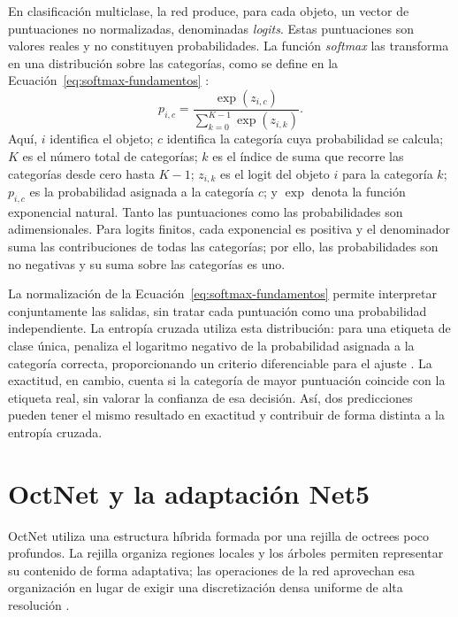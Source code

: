 En clasificación multiclase, la red produce, para cada objeto, un vector de puntuaciones no normalizadas, denominadas \emph{logits}. Estas puntuaciones son valores reales y no constituyen probabilidades. La función \emph{softmax} las transforma en una distribución sobre las categorías, como se define en la Ecuación~\eqref{eq:softmax-fundamentos} \parencite{goodfellow2016}:
\begin{equation}
 p_{i,c}=\frac{\exp(z_{i,c})}{\displaystyle\sum_{k=0}^{K-1}\exp(z_{i,k})}.
 \label{eq:softmax-fundamentos}
\end{equation}
Aquí, $i$ identifica el objeto; $c$ identifica la categoría cuya probabilidad se calcula; $K$ es el número total de categorías; $k$ es el índice de suma que recorre las categorías desde cero hasta $K-1$; $z_{i,k}$ es el logit del objeto $i$ para la categoría $k$; $p_{i,c}$ es la probabilidad asignada a la categoría $c$; y $\exp$ denota la función exponencial natural. Tanto las puntuaciones como las probabilidades son adimensionales. Para logits finitos, cada exponencial es positiva y el denominador suma las contribuciones de todas las categorías; por ello, las probabilidades son no negativas y su suma sobre las categorías es uno.

La normalización de la Ecuación~\eqref{eq:softmax-fundamentos} permite interpretar conjuntamente las salidas, sin tratar cada puntuación como una probabilidad independiente. La entropía cruzada utiliza esta distribución: para una etiqueta de clase única, penaliza el logaritmo negativo de la probabilidad asignada a la categoría correcta, proporcionando un criterio diferenciable para el ajuste \parencite{goodfellow2016}. La exactitud, en cambio, cuenta si la categoría de mayor puntuación coincide con la etiqueta real, sin valorar la confianza de esa decisión. Así, dos predicciones pueden tener el mismo resultado en exactitud y contribuir de forma distinta a la entropía cruzada.

\section{OctNet y la adaptación Net5}
\label{sec:octnet-net5}
OctNet utiliza una estructura híbrida formada por una rejilla de octrees poco profundos. La rejilla organiza regiones locales y los árboles permiten representar su contenido de forma adaptativa; las operaciones de la red aprovechan esa organización en lugar de exigir una discretización densa uniforme de alta resolución \parencite{riegler2017}.

